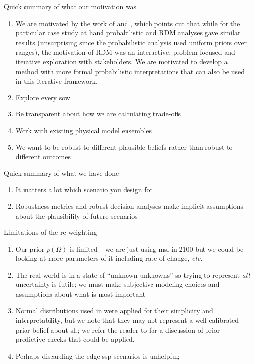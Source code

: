 \documentclass[11pt]{article}
\makeatletter
\DeclareRobustCommand\onedot{\futurelet\@let@token\@onedot}
\def\@onedot{\ifx\@let@token.\else.\null\fi\xspace}
\def\etc{\emph{etc}\onedot} \def\vs{\emph{vs}\onedot}
\DeclareRobustCommand\onedot{\futurelet\@let@token\@onedot}
\def\@onedot{\ifx\@let@token.\else.\null\fi\xspace}
\def\etc{\emph{etc}\onedot} \def\vs{\emph{vs}\onedot}
\makeatother
\begin{document}
Quick summary of what our motivation was
\begin{enumerate}
    \item We are motivated by the work of \citet{sriver_sealevel:2018} and \citet{lempert_slr:2012}, which points out that while for the particular case study at hand probabilistic and RDM analyses gave similar results (unsurprising since the probabilistic analysis used uniform priors over ranges), the motivation of RDM was an interactive,  problem-focused and iterative exploration with stakeholders. We are motivated to develop a method with more formal probabilistic interpretations that can also be used in this iterative framework.
    \item Explore every \gls{sow}
    \item Be transparent about how we are calculating trade-offs
    \item Work with existing physical model ensembles
    \item We want to be robust to different plausible beliefs rather than robust to different outcomes
\end{enumerate}
Quick summary of what we have done
\begin{enumerate}
    \item It matters a lot which scenario you design for
    \item Robustness metrics and robust decision analyses make implicit assumptions about the plausibility of future scenarios
\end{enumerate}
Limitations of the re-weighting
\begin{enumerate}
    \item Our prior $p(\Omega)$ is limited -- we are just using \gls{msl} in 2100 but we could be looking at more parameters of it including rate of change, \etc
    \item The real world is in a state of ``unknown unknowns'' \citep[level 5 as defined in][fig.~1]{walker_deep:2013} so trying to represent \emph{all} uncertainty is futile; we must make subjective modeling choices and assumptions about what is most important
    \item Normal distributions used in \citet{fuller_inversion:2017} were applied for their simplicity and interpretability, but we note that they may not represent a well-calibrated prior belief about \gls{slr}; we refer the reader to \citet{gelman_workflow:2020} for a discussion of prior predictive checks that could be applied.
    \item Perhaps discarding the edge \gls{ssp} scenarios is unhelpful;
\end{enumerate}
\end{document}
